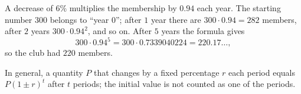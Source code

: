 A decrease of $6\%$ multiplies the membership by $0.94$ each year. The starting number $300$ belongs to ``year $0$''; after $1$ year there are $300\cdot0.94=282$ members, after $2$ years $300\cdot0.94^2$, and so on. After $5$ years the formula gives
\[
300\cdot0.94^5=300\cdot0.7339040224=220.17\ldots,
\]
so the club had $\boxed{220}$ members.

In general, a quantity $P$ that changes by a fixed percentage $r$ each period equals $P(1\pm r)^t$ after $t$ periods; the initial value is not counted as one of the periods.
